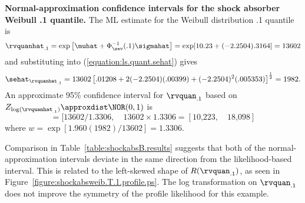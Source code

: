 \begin{example}
{\bf Normal-approximation confidence intervals
for the shock absorber Weibull .1 quantile.}
The ML estimate for the Weibull distribution .1 quantile is
\begin{displaymath}
\rvquanhat_{.1}=
\exp \left [\muhat+\Phi_{\sev}^{-1}(.1)\sigmahat \right ] =
\exp[10.23+(-2.2504).3164]=13602
\end{displaymath} 
%
%
%
and substituting into (\ref{equation:ls.quant.sehat}) gives
\begin{displaymath}
\sehat_{\rvquanhat_{.1}}=13602 \left [ .01208+
2 (-2.2504) (.00399) +(-2.2504)^2 (.005353) \right ] ^ {\frac{1}{2}} = 1982.
\end{displaymath}
%
%
%
%
An approximate  95\% confidence
interval for $\rvquan_{.1}$ based on $Z_{\log(\rvquanhat_{.1})}
\approxdist \NOR(0,1)$ is
\begin{displaymath}
[ \undertilde{\rvquan_{.1}}, \quad \tilde{\rvquan}_{.1} ]=
[13602/1.3306, \quad
13602 \times 1.3306 = [\text{10,223}, \quad  \text{18,098}]
\end{displaymath}
%
%
where $w=\exp[1.960(1982)/13602]=1.3306$.

Comparison in Table~\ref{table:shockabsB.results}
suggests that both of the normal-approximation intervals deviate
in the same direction from the likelihood-based interval.
This is related to the left-skewed shape of
$R(\rvquan_{.1})$, as seen in 
Figure~\ref{figure:shockabsweib.T.1.profile.ps}.
The log transformation on $\rvquan_{.1}$ 
does not improve the symmetry of the profile likelihood
for this example.
\end{example}

